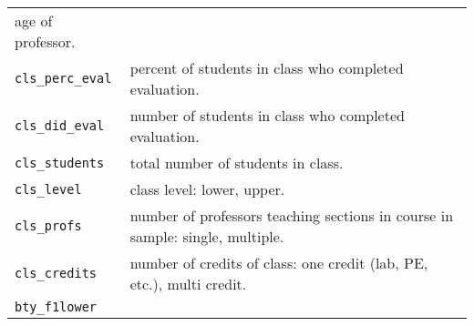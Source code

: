 \documentclass[
]{article}
\begin{document}
\begin{longtable}[]{@{}ll@{}}
\begin{minipage}[t]{0.38\columnwidth}
age of professor.\strut
\end{minipage}\tabularnewline
\begin{minipage}[t]{0.56\columnwidth}\raggedright
\texttt{cls\_perc\_eval}\strut
\end{minipage} & \begin{minipage}[t]{0.38\columnwidth}\raggedright
percent of students in class who completed evaluation.\strut
\end{minipage}\tabularnewline
\begin{minipage}[t]{0.56\columnwidth}\raggedright
\texttt{cls\_did\_eval}\strut
\end{minipage} & \begin{minipage}[t]{0.38\columnwidth}\raggedright
number of students in class who completed evaluation.\strut
\end{minipage}\tabularnewline
\begin{minipage}[t]{0.56\columnwidth}\raggedright
\texttt{cls\_students}\strut
\end{minipage} & \begin{minipage}[t]{0.38\columnwidth}\raggedright
total number of students in class.\strut
\end{minipage}\tabularnewline
\begin{minipage}[t]{0.56\columnwidth}\raggedright
\texttt{cls\_level}\strut
\end{minipage} & \begin{minipage}[t]{0.38\columnwidth}\raggedright
class level: lower, upper.\strut
\end{minipage}\tabularnewline
\begin{minipage}[t]{0.56\columnwidth}\raggedright
\texttt{cls\_profs}\strut
\end{minipage} & \begin{minipage}[t]{0.38\columnwidth}\raggedright
number of professors teaching sections in course in sample: single,
multiple.\strut
\end{minipage}\tabularnewline
\begin{minipage}[t]{0.56\columnwidth}\raggedright
\texttt{cls\_credits}\strut
\end{minipage} & \begin{minipage}[t]{0.38\columnwidth}\raggedright
number of credits of class: one credit (lab, PE, etc.), multi
credit.\strut
\end{minipage}\tabularnewline
\begin{minipage}[t]{0.56\columnwidth}\raggedright
\texttt{bty\_f1lower}\strut
\end{minipage} & \begin{minipage}[t]{0.38\columnwidth}\raggedright

\end{minipage}
\end{longtable}
\end{document}
